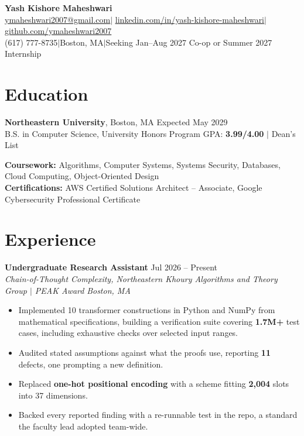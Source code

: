 \documentclass[letterpaper,10pt]{article}
\let\hrefplain\href
\renewcommand{\href}[2]{\hrefplain{#1}{\uline{#2}}}
\newcommand{\entrysize}{\fontsize{10.5}{12}\selectfont}
\newif\ifentrygap
\newcommand{\entrygapsize}{6pt}
\newcommand{\entryfirstgap}{0.4pt}
\newcommand{\entrysep}{\ifentrygap\vspace{\entrygapsize}\else\vspace{\entryfirstgap}\fi\global\entrygaptrue}
\let\entryorigsection\section
\renewcommand{\section}{\global\entrygapfalse\entryorigsection}
\newcommand{\entry}[4]{\entrysep{\entrysize\textbf{#1}} \hfill #2 \\ \textit{#3} \hfill \textit{#4}}
\newcommand{\hsep}{\hspace{0.2222em minus 0.1em}$\vert$\hspace{0.2222em minus 0.1em}}
\begin{document}
\begin{center}
  {\fontsize{18}{20}\selectfont\bfseries Yash Kishore Maheshwari}\\[3pt]
  \href{mailto:ymaheshwari2007@gmail.com}{ymaheshwari2007@gmail.com}\hsep%
  \href{https://linkedin.com/in/yash-kishore-maheshwari}{linkedin.com/in/yash-kishore-maheshwari}\hsep%
  \href{https://github.com/ymaheshwari2007}{github.com/ymaheshwari2007}\\
  (617) 777-8735\hsep Boston, MA\hsep Seeking Jan--Aug 2027 Co-op or Summer 2027 Internship
\end{center}

\section{Education}

\textbf{Northeastern University}, Boston, MA \hfill Expected May 2029 \\
B.S. in Computer Science, University Honors Program \hfill
GPA: \textbf{3.99/4.00} $\vert$ Dean's List

\vspace{1pt}
\textbf{Coursework:} Algorithms, Computer Systems, Systems Security, Databases, Cloud Computing, Object-Oriented Design \\
\textbf{Certifications:} AWS Certified Solutions Architect -- Associate, Google Cybersecurity Professional Certificate

\section{Experience}

\entry{Undergraduate Research Assistant}{Jul 2026 -- Present}
      {Chain-of-Thought Complexity, Northeastern Khoury Algorithms and Theory Group $\vert$ PEAK Award}{Boston, MA}
\begin{itemize}
  \item Implemented 10 transformer constructions in Python and NumPy from mathematical specifications, building a
        verification suite covering \textbf{1.7M+} test cases, including exhaustive checks over selected input ranges.
  \item Audited stated assumptions against what the proofs use, reporting \textbf{11} defects, one prompting a new definition.
  \item Replaced \textbf{one-hot positional encoding} with a scheme fitting \textbf{2,004} slots into 37 dimensions.
  \item Backed every reported finding with a re-runnable test in the repo, a standard the faculty lead adopted team-wide.
\end{itemize}
\end{document}
